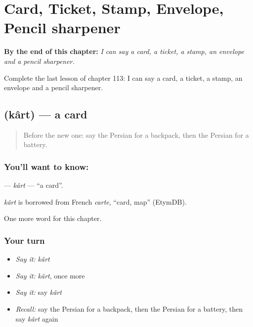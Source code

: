 
\chapter{Card, Ticket, Stamp, Envelope, Pencil sharpener}
\label{ch:fa-card-ticket-stamp-envelope-pencil-sharpener}

\begin{chapteropening}
\textbf{By the end of this chapter:} \emph{I can say a card, a ticket, a stamp, an envelope and a pencil sharpener.}

Complete the last lesson of chapter 113: I can say a card, a ticket, a stamp, an envelope and a pencil sharpener.
\end{chapteropening}

\section[\texorpdfstring{\fa{کارت} (kârt)}{کارت (kârt)}]{ (kârt) — a card}

\label{lesson:FA-C113-kart}



\begin{quote}
Before the new one: say the Persian for a backpack, then the Persian for a battery.
\end{quote}

\subsection*{You'll want to know: }
\textbf{} — \emph{kârt} — \textquotedblleft{}a card\textquotedblright{}.

\begin{cousinweb}
\emph{kârt} is borrowed from French \emph{carte}, \textquotedblleft{}card, map\textquotedblright{} (EtymDB).
\end{cousinweb}

\begin{grammarlens}[title={What you've built}]
One more word for this chapter.
\end{grammarlens}

\subsection*{Your turn}
\begin{itemize}
\raggedright
  \item \emph{Say it:} \emph{kârt}
  \item \emph{Say it:} \emph{kârt}, once more
  \item \emph{Say it:} say \emph{kârt}
  \item \emph{Recall:} say the Persian for a backpack, then the Persian for a battery, then say \emph{kârt} again
\end{itemize}


